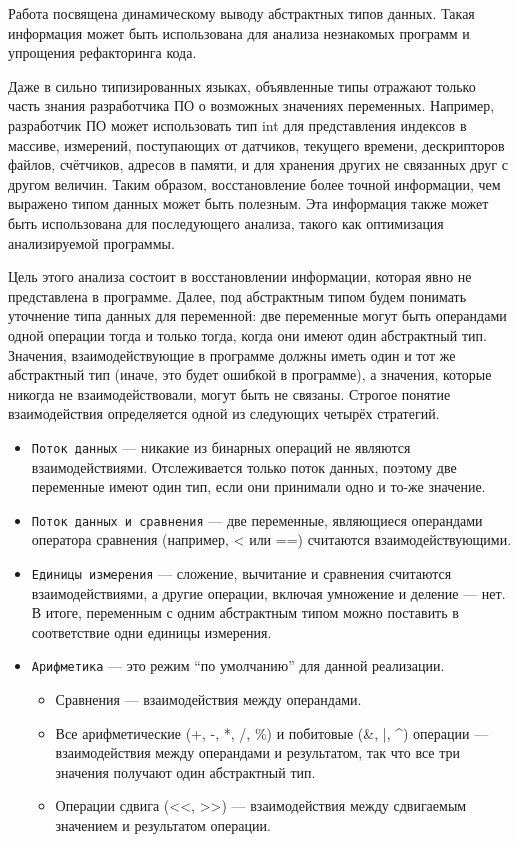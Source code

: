 \documentclass[a4paper,12pt,russian]{article}
\newcommand{\code}[1]{\textsf{#1}}
\begin{document}
Работа \cite{abstracttypes} посвящена динамическому выводу абстрактных типов данных.
Такая информация может быть использована для анализа незнакомых программ и упрощения рефакторинга кода.

Даже в сильно типизированных языках, объявленные типы отражают только часть знания разработчика ПО о возможных значениях переменных.
Например, разработчик ПО может использовать тип \code{int} для представления индексов в массиве, измерений, поступающих от датчиков, текущего времени, дескрипторов файлов, счётчиков, адресов в памяти, и для хранения других не связанных друг с другом величин.
Таким образом, восстановление более точной информации, чем выражено типом данных может быть полезным.
Эта информация также может быть использована для последующего анализа, такого как оптимизация анализируемой программы.

Цель этого анализа состоит в восстановлении информации, которая явно не представлена в программе.
Далее, под абстрактным типом будем понимать уточнение типа данных для переменной: две переменные могут быть операндами одной операции тогда и только тогда, когда они имеют один абстрактный тип.
Значения, взаимодействующие в программе должны иметь один и тот же абстрактный тип (иначе, это будет ошибкой в программе), а значения, которые никогда не взаимодействовали, могут быть не связаны.
Строгое понятие взаимодействия определяется одной из следующих четырёх стратегий.
\begin{itemize}
\item \texttt{Поток данных} --- никакие из бинарных операций не являются взаимодействиями. Отслеживается только поток данных, поэтому две переменные имеют один тип, если они принимали одно и то-же значение.
\item \texttt{Поток данных и сравнения} --- две переменные, являющиеся операндами оператора сравнения (например, \code{<} или \code{==}) считаются взаимодействующими.
\item \texttt{Единицы измерения} --- сложение, вычитание и сравнения считаются взаимодействиями, а другие операции, включая умножение и деление --- нет. В итоге, переменным с одним абстрактным типом можно поставить в соответствие одни единицы измерения.
\item \texttt{Арифметика} --- это режим ``по умолчанию'' для данной реализации.
  \begin{itemize}
    \item Сравнения --- взаимодействия между операндами.
    \item Все арифметические (\code{+}, \code{-}, \code{*}, \code{/}, \code{\%}) и побитовые (\code{\&}, \code{|}, \code{\^}) операции --- взаимодействия между операндами и результатом, так что все три значения получают один абстрактный тип.
    \item Операции сдвига (\code{<}\code{<}, \code{>}\code{>}) --- взаимодействия между сдвигаемым значением и результатом операции.
  \end{itemize}
\end{itemize}
\end{document}
